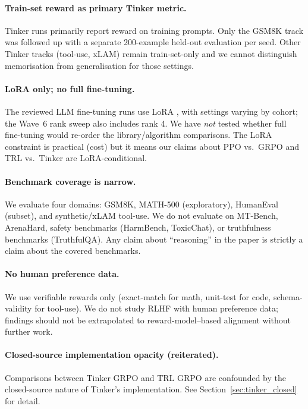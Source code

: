 \paragraph{Train-set reward as primary Tinker metric.}
Tinker runs primarily report reward on training prompts. Only the GSM8K
track was followed up with a separate 200-example held-out evaluation
per seed. Other Tinker tracks (tool-use, xLAM) remain train-set-only and
we cannot distinguish memorisation from generalisation for those
settings.

\paragraph{LoRA only; no full fine-tuning.}
The reviewed LLM fine-tuning runs use LoRA \cite{hu2022lora}, with settings
varying by cohort; the Wave~6 rank sweep also includes rank 4. We have
\emph{not} tested whether full fine-tuning would re-order the
library/algorithm comparisons. The LoRA constraint is practical (cost) but
it means our claims about PPO vs.\ GRPO and TRL vs.\ Tinker are
LoRA-conditional.

\paragraph{Benchmark coverage is narrow.}
We evaluate four domains: GSM8K, MATH-500 (exploratory), HumanEval
(subset), and synthetic/xLAM tool-use. We do not evaluate on MT-Bench,
ArenaHard, safety benchmarks (HarmBench, ToxicChat), or truthfulness
benchmarks (TruthfulQA). Any claim about ``reasoning'' in the paper is
strictly a claim about the covered benchmarks.

\paragraph{No human preference data.}
We use verifiable rewards only (exact-match for math, unit-test for code,
schema-validity for tool-use). We do not study RLHF with human preference
data; findings should not be extrapolated to reward-model--based alignment
without further work.

\paragraph{Closed-source implementation opacity (reiterated).}
Comparisons between Tinker GRPO and TRL GRPO are confounded by the
closed-source nature of Tinker's implementation. See
Section~\ref{sec:tinker_closed} for detail.


